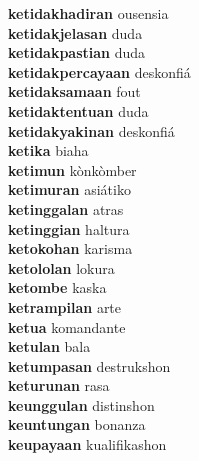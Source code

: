 \textbf{ketidakhadiran } ousensia \\
\textbf{ketidakjelasan } duda \\
\textbf{ketidakpastian } duda \\
\textbf{ketidakpercayaan } deskonfiá \\
\textbf{ketidaksamaan } fout \\
\textbf{ketidaktentuan } duda \\
\textbf{ketidakyakinan } deskonfiá \\
\textbf{ketika } biaha \\
\textbf{ketimun } kònkòmber \\
\textbf{ketimuran } asiátiko \\
\textbf{ketinggalan } atras \\
\textbf{ketinggian } haltura \\
\textbf{ketokohan } karisma \\
\textbf{ketololan } lokura \\
\textbf{ketombe } kaska \\
\textbf{ketrampilan } arte \\
\textbf{ketua } komandante \\
\textbf{ketulan } bala \\
\textbf{ketumpasan } destrukshon \\
\textbf{keturunan } rasa \\
\textbf{keunggulan } distinshon \\
\textbf{keuntungan } bonanza \\
\textbf{keupayaan } kualifikashon \\

